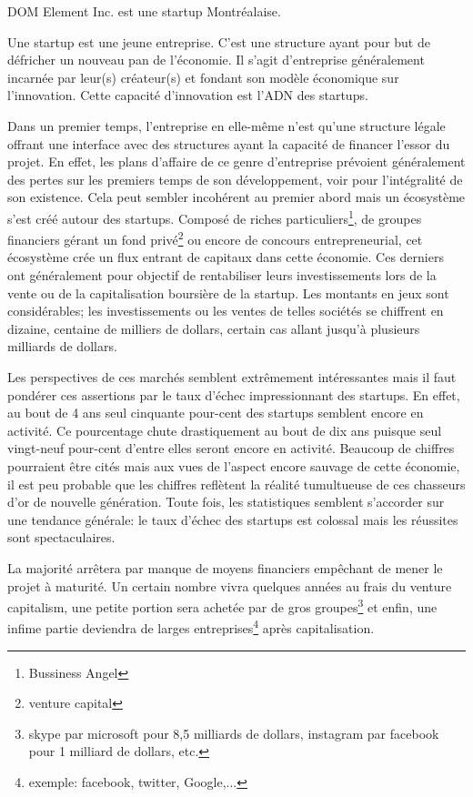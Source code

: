 \documentclass[11pt, a4paper ]{article}
\begin{document}
\begin{spacing}{1.5}
DOM Element Inc. est une startup Montréalaise.

Une startup est une jeune entreprise. C'est une structure ayant pour but de défricher un nouveau pan de l'économie. Il s'agit d'entreprise généralement incarnée par leur(s) créateur(s) et fondant son modèle économique sur l'innovation. Cette capacité d'innovation est l'ADN des startups.

Dans un premier temps, l'entreprise en elle-même n'est qu'une structure légale offrant une interface avec des structures ayant la capacité de financer l’essor du projet. En effet, les plans d'affaire de ce genre d'entreprise prévoient généralement des pertes sur les premiers temps de son développement, voir pour l'intégralité de son existence. Cela peut sembler incohérent au premier abord mais un écosystème s'est créé autour des startups. Composé de riches particuliers\footnote{Bussiness Angel}, de groupes financiers gérant un fond privé\footnote{venture capital} ou encore de concours entrepreneurial, cet écosystème crée un flux entrant de capitaux dans cette économie. Ces derniers ont généralement pour objectif de rentabiliser leurs investissements lors de la vente ou de la capitalisation boursière de la startup. Les montants en jeux sont considérables; les investissements ou les ventes de telles sociétés se chiffrent en dizaine, centaine de milliers de dollars, certain cas allant jusqu'à plusieurs milliards de dollars.

Les perspectives de ces marchés semblent extrêmement intéressantes mais il faut pondérer ces assertions par le taux d'échec impressionnant des startups. En effet, au bout de 4 ans seul cinquante pour-cent des startups semblent encore en activité. Ce pourcentage chute drastiquement au bout de dix ans puisque seul vingt-neuf pour-cent d'entre elles seront encore en activité.
Beaucoup de chiffres pourraient être cités mais aux vues de l'aspect encore sauvage de cette économie, il est peu probable que les chiffres reflètent la réalité tumultueuse de ces chasseurs d'or de nouvelle génération.
Toute fois, les statistiques semblent s'accorder sur une tendance générale: le taux d'échec des startups est colossal mais les réussites sont spectaculaires.

La majorité arrêtera par manque de moyens financiers empêchant de mener le projet à maturité. Un certain nombre vivra quelques années au frais du venture capitalism, une petite portion sera achetée par de gros groupes\footnote{skype par microsoft pour 8,5 milliards de dollars, instagram par facebook pour 1 milliard de dollars, etc.} et enfin, une infime partie deviendra de larges entreprises\footnote{exemple: facebook, twitter, Google,...} après capitalisation.


\end{spacing}
\end{document}
